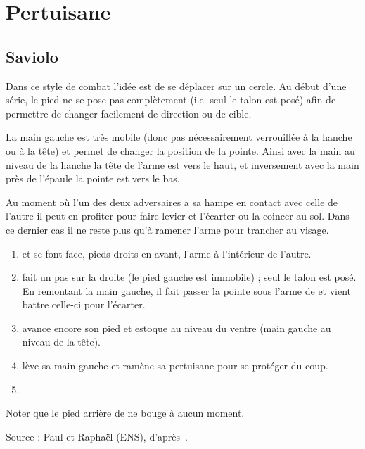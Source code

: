 \chapter{Pertuisane}

\section{Saviolo}

Dans ce style de combat l'idée est de se déplacer sur un cercle. Au début d'une série, le pied ne se pose pas complètement (i.e. seul le talon est posé) afin de permettre de changer facilement de direction ou de cible.

La main gauche est très mobile (donc pas nécessairement verrouillée à la hanche ou à la tête) et permet de changer la position de la pointe. Ainsi avec la main au niveau de la hanche la tête de l'arme est vers le haut, et inversement avec la main près de l'épaule la pointe est vers le bas.

Au moment où l'un des deux adversaires a sa hampe en contact avec celle de l'autre il peut en profiter pour faire levier et l'écarter ou la coincer au sol. Dans ce dernier cas il ne reste plus qu'à ramener l'arme pour trancher au visage.


\begin{technique}

\begin{enumerate}
	\item \A et \D se font face, pieds droits en avant, l'arme à l'intérieur de l'autre.
	
	\item \A fait un pas sur la droite (le pied gauche est immobile) ; seul le talon est posé. En remontant la main gauche, il fait passer la pointe sous l'arme de \D et vient battre celle-ci pour l'écarter.
	
	\item \A avance encore son pied et estoque au niveau du ventre (main gauche au niveau de la tête).
	
	\item \D lève sa main gauche et ramène sa pertuisane pour se protéger du coup.
	
	\item {}
\end{enumerate}

Noter que le pied arrière de \A ne bouge à aucun moment.

Source : Paul et Raphaël (ENS), d'après~\cite{livermore:cornucopia:partizan:2014}.
\end{technique}


